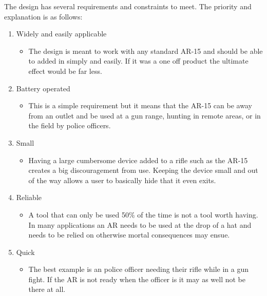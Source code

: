 The design has several requirements and constraints to meet. 
The priority and explanation is as follows:
\begin{enumerate}
    \item Widely and easily applicable
        \begin{itemize}
            \item The design is meant to work with any standard AR-15 and should be able to 
                  added in simply and easily. If it was a one off product the ultimate effect
                  would be far less.  
        \end{itemize}
    \item Battery operated
        \begin{itemize}
            \item This is a simple requirement but it means that the AR-15 can be away from
                  an outlet and be used at a gun range, hunting in remote areas, or in the field
                  by police officers.
        \end{itemize}
    \item Small
        \begin{itemize}
            \item Having a large cumbersome device added to a rifle such as the AR-15 
                  creates a big discouragement from use. Keeping the device small and out
                  of the way allows a user to basically hide that it even exits.
        \end{itemize}
    \item Reliable
        \begin{itemize}
            \item A tool that can only be used 50\% of the time is not a tool worth having.
                  In many applications an AR needs to be used at the drop of a hat and needs
                  to be relied on otherwise mortal consequences may ensue.
        \end{itemize}
    \item Quick
        \begin{itemize}
            \item The best example is an police officer needing their rifle while in a gun fight.
                  If the AR is not ready when the officer is it may as well not be there at all.
        \end{itemize}
\end{enumerate}